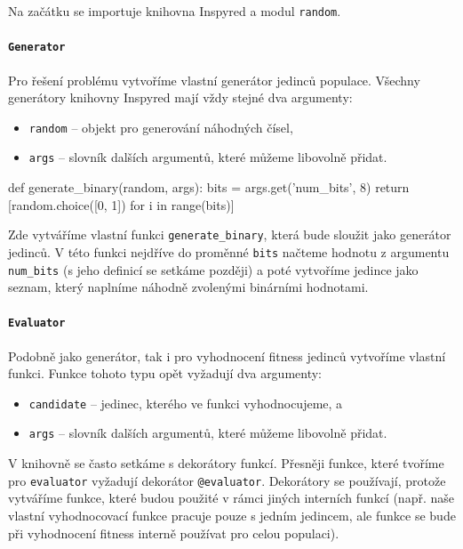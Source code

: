 Na začátku se importuje knihovna Inspyred a modul \texttt{random}.

\paragraph{\texttt{Generator}}
Pro řešení problému vytvoříme vlastní generátor jedinců populace. Všechny
generátory knihovny Inspyred mají vždy stejné dva argumenty:
\begin{itemize}
    \item \texttt{random} -- objekt pro generování náhodných čísel,
    \item \texttt{args} -- slovník dalších argumentů, které můžeme libovolně
        přidat.
\end{itemize}

\begin{code}
def generate_binary(random, args):
    bits = args.get('num_bits', 8)
    return [random.choice([0, 1]) for i in range(bits)]
\end{code}

Zde vytváříme vlastní funkci \texttt{generate\_binary}, která bude sloužit jako
generátor jedinců. V této funkci nejdříve do proměnné \texttt{bits} načteme
hodnotu z argumentu \texttt{num\_bits} (s jeho definicí se setkáme později) a
poté vytvoříme jedince jako seznam, který naplníme náhodně zvolenými binárními
hodnotami.

\paragraph{\texttt{Evaluator}}
Podobně jako generátor, tak i pro vyhodnocení fitness jedinců vytvoříme vlastní
funkci. Funkce tohoto typu opět vyžadují dva argumenty:
\begin{itemize}
    \item \texttt{candidate} -- jedinec, kterého ve funkci vyhodnocujeme, a
    \item \texttt{args} -- slovník dalších argumentů, které můžeme libovolně
        přidat.
\end{itemize}

V knihovně se často setkáme s dekorátory funkcí. Přesněji funkce, které tvoříme
pro \texttt{evaluator} vyžadují dekorátor \texttt{@evaluator}. Dekorátory se
používají, protože vytváříme funkce, které budou použité v rámci jiných
interních funkcí (např. naše vlastní vyhodnocovací funkce pracuje pouze s
jedním jedincem, ale funkce se bude při vyhodnocení fitness interně používat
pro celou populaci).

